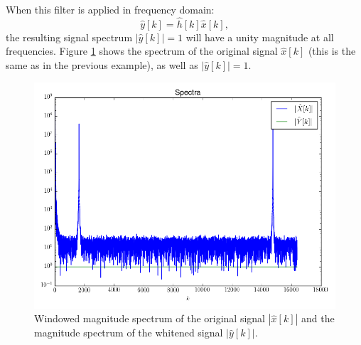 When this filter is applied in frequency domain:
\begin{equation}
\hat{y}[k] = \hat{h}[k]\hat{x}[k],
\end{equation}
the resulting signal spectrum $|\hat{y}[k]|=1$ will have a unity
magnitude at all frequencies. Figure \ref{fig:whiten_specs} shows the
spectrum of the original signal $\hat{x}[k]$ (this is the same as in
the previous example), as well as $|\hat{y}[k]|=1$.

\begin{figure}
\begin{center}
\includegraphics[width=\textwidth]{ch17/figures/whiten_spec.png}
\end{center}
\caption{Windowed magnitude spectrum of the original signal $|\hat{x}[k]|$ and the magnitude spectrum of the whitened signal $|\hat{y}[k]|$.}
\label{fig:whiten_specs}
\end{figure}

